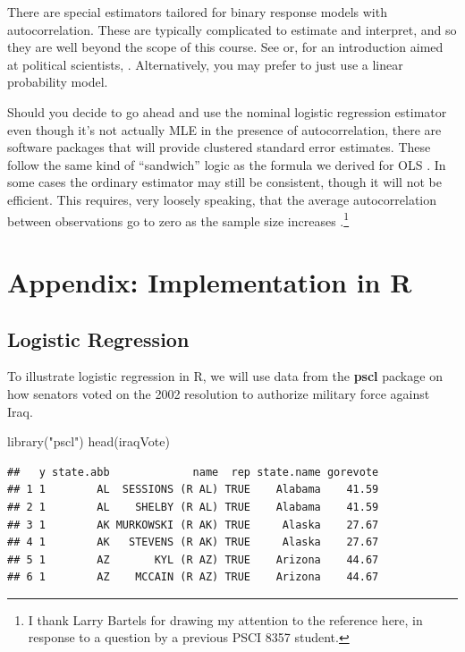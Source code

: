 \documentclass[
  12pt,
  oneside,openany]{book}
\newenvironment{Shaded}{\begin{snugshade}}{\end{snugshade}}
\newcommand{\FunctionTok}[1]{\textcolor[rgb]{0.00,0.00,0.00}{#1}}
\newcommand{\NormalTok}[1]{#1}
\newcommand{\StringTok}[1]{\textcolor[rgb]{0.31,0.60,0.02}{#1}}
\begin{document}
There are special estimators tailored for binary response models with autocorrelation.
These are typically complicated to estimate and interpret, and so they are well beyond the scope of this course.
See \citet{huffer1998markov} or, for an introduction aimed at political scientists, \citet{ward2002location}.
Alternatively, you may prefer to just use a linear probability model.

Should you decide to go ahead and use the nominal logistic regression estimator even though it's not actually MLE in the presence of autocorrelation, there are software packages that will provide clustered standard error estimates.
These follow the same kind of ``sandwich'' logic as the formula we derived for OLS \citep{Liang:1986gv}.
In some cases the ordinary estimator may still be consistent, though it will not be efficient.
This requires, very loosely speaking, that the average autocorrelation between observations go to zero as the sample size increases \citep{poirier1988probit}.\footnote{I thank Larry Bartels for drawing my attention to the reference here, in response to a question by a previous PSCI 8357 student.}

\hypertarget{appendix-implementation-in-r-2}{%
\section{Appendix: Implementation in R}\label{appendix-implementation-in-r-2}}

\hypertarget{logistic-regression-1}{%
\subsection{Logistic Regression}\label{logistic-regression-1}}

To illustrate logistic regression in R, we will use data from the \textbf{pscl} package on how senators voted on the 2002 resolution to authorize military force against Iraq.

\begin{Shaded}
\begin{Highlighting}[]
\FunctionTok{library}\NormalTok{(}\StringTok{"pscl"}\NormalTok{)}
\FunctionTok{head}\NormalTok{(iraqVote)}
\end{Highlighting}
\end{Shaded}

\begin{verbatim}
##   y state.abb             name  rep state.name gorevote
## 1 1        AL  SESSIONS (R AL) TRUE    Alabama    41.59
## 2 1        AL    SHELBY (R AL) TRUE    Alabama    41.59
## 3 1        AK MURKOWSKI (R AK) TRUE     Alaska    27.67
## 4 1        AK   STEVENS (R AK) TRUE     Alaska    27.67
## 5 1        AZ       KYL (R AZ) TRUE    Arizona    44.67
## 6 1        AZ    MCCAIN (R AZ) TRUE    Arizona    44.67
\end{verbatim}
\end{document}
